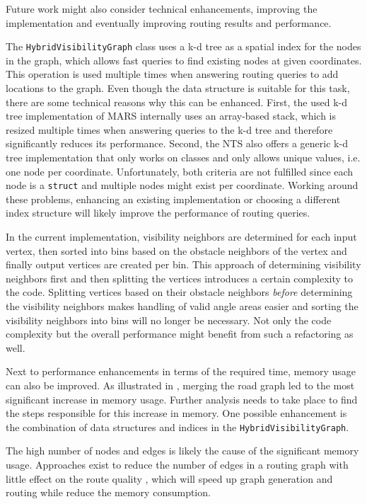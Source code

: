 		Future work might also consider technical enhancements, improving the implementation and eventually improving routing results and performance.
	
		The \texttt{HybridVisibilityGraph} class uses a k-d tree as a spatial index for the nodes in the graph, which allows fast queries to find existing nodes at given coordinates.
		This operation is used multiple times when answering routing queries to add locations to the graph.
		Even though the data structure is suitable for this task, there are some technical reasons why this can be enhanced.
		First, the used k-d tree implementation of MARS internally uses an array-based stack, which is resized multiple times when answering queries to the k-d tree and therefore significantly reduces its performance.
		Second, the NTS also offers a generic k-d tree implementation that only works on classes and only allows unique values, i.e. one node per coordinate.
		Unfortunately, both criteria are not fulfilled since each node is a \texttt{struct} and multiple nodes might exist per coordinate.
		Working around these problems, enhancing an existing implementation or choosing a different index structure will likely improve the performance of routing queries.
		
		In the current implementation, visibility neighbors are determined for each input vertex, then sorted into bins based on the obstacle neighbors of the vertex and finally output vertices are created per bin.
		This approach of determining visibility neighbors first and then splitting the vertices introduces a certain complexity to the code.
		Splitting vertices based on their obstacle neighbors \emph{before} determining the visibility neighbors makes handling of valid angle areas easier and sorting the visibility neighbors into bins will no longer be necessary.
		Not only the code complexity but the overall performance might benefit from such a refactoring as well.
		
		Next to performance enhancements in terms of the required time, memory usage can also be improved.
		As illustrated in , merging the road graph led to the most significant increase in memory usage.
		Further analysis needs to take place to find the steps responsible for this increase in memory.
		One possible enhancement is the combination of data structures and indices in the \texttt{HybridVisibilityGraph}.
		
		The high number of nodes and edges is likely the cause of the significant memory usage.
		Approaches exist to reduce the number of edges in a routing graph with little effect on the route quality \cite{aumann-reducing-routing-graph}, which will speed up graph generation and routing while reduce the memory consumption.

